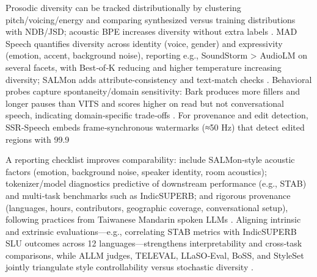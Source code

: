 Prosodic diversity can be tracked distributionally by clustering pitch/voicing/energy and comparing synthesized versus training distributions with NDB/JSD; acoustic BPE increases diversity without extra labels \cite{li2024effectivenessacousticbpedecoderonlytts}. MAD Speech quantifies diversity across identity (voice, gender) and expressivity (emotion, accent, background noise), reporting e.g., SoundStorm > AudioLM on several facets, with Best‑of‑K reducing and higher temperature increasing diversity; SALMon adds attribute‑consistency and text‑match checks \cite{futeral2025madspeechmeasuresacousticdiversity,maimon2025salmonsuiteacousticlanguagemodelevaluati}. Behavioral probes capture spontaneity/domain sensitivity: Bark produces more fillers and longer pauses than VITS and scores higher on read but not conversational speech, indicating domain‑specific trade‑offs \cite{wang2024evaluatingtextspeechsynthesislargediscre}. For provenance and edit detection, SSR‑Speech embeds frame‑synchronous watermarks (≈50 Hz) that detect edited regions with 99.9%

A reporting checklist improves comparability: include SALMon‑style acoustic factors (emotion, background noise, speaker identity, room acoustics); tokenizer/model diagnostics predictive of downstream performance (e.g., STAB) and multi‑task benchmarks such as IndicSUPERB; and rigorous provenance (languages, hours, contributors, geographic coverage, conversational setup), following practices from Taiwanese Mandarin spoken LLMs \cite{maimon2025salmonsuiteacousticlanguagemodelevaluati,vashishth2024stabspeechtokenizerassessmentbenchmark,entry2025indicsuperbspeechprocessinguniversalperf,yang2024buildingtaiwanesemandarinspokenlanguagem}. Aligning intrinsic and extrinsic evaluations—e.g., correlating STAB metrics with IndicSUPERB SLU outcomes across 12 languages—strengthens interpretability and cross‑task comparisons, while ALLM judges, TELEVAL, LLaSO‑Eval, BoSS, and StyleSet jointly triangulate style controllability versus stochastic diversity \cite{vashishth2024stabspeechtokenizerassessmentbenchmark,entry2025indicsuperbspeechprocessinguniversalperf,chiang2025audioawarelargelanguagemodelsasjudgesspe,li2025televaldynamicbenchmarkdesignedspokenlan,sun2025llasofoundationalframeworkreproduciblere,wang2025bossbeyondsemanticspeech}.

















